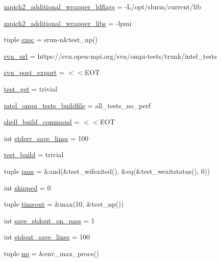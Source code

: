 \begin{DoxyCompactItemize}
\item 
\hyperlink{namespacempich2-template_ae2865f33a6b3ae966c6e7b785d0553b5}{mpich2\-\_\-additional\-\_\-wrapper\-\_\-ldflags} = -\/L/opt/slurm/current/lib
\item 
\hyperlink{namespacempich2-template_a93955bb1c58ee54b6ec759ce3ec7ab05}{mpich2\-\_\-additional\-\_\-wrapper\-\_\-libs} = -\/lpmi
\item 
tuple \hyperlink{namespacempich2-template_a3e54d8824fc59af417917b87182bdeb7}{exec} = srun-\/n\&test\-\_\-np()
\item 
\hyperlink{namespacempich2-template_a4951a49f371e925195481dc34a166a0a}{svn\-\_\-url} = https\-://svn.\-open-\/mpi.\-org/svn/ompi-\/tests/trunk/intel\-\_\-tests
\item 
\hyperlink{namespacempich2-template_a8bdb132d6863e51986a00ebae55adabd}{svn\-\_\-post\-\_\-export} = $<$$<$E\-O\-T
\item 
\hyperlink{namespacempich2-template_abf3c50e4ed6bd38b7845e7aa1d9b4a67}{test\-\_\-get} = trivial
\item 
\hyperlink{namespacempich2-template_addb99c522a88e9f52ea85bfbb54d50be}{intel\-\_\-ompi\-\_\-tests\-\_\-buildfile} = all\-\_\-tests\-\_\-no\-\_\-perf
\item 
\hyperlink{namespacempich2-template_a79f63031d3664a486ed5bab613e4468f}{shell\-\_\-build\-\_\-command} = $<$$<$E\-O\-T
\item 
int \hyperlink{namespacempich2-template_a4526a47057dcced7297a2eb36bc0f73c}{stderr\-\_\-save\-\_\-lines} = 100
\item 
\hyperlink{namespacempich2-template_a74bcc1b555e44b4c152e7a6cba7bdd41}{test\-\_\-build} = trivial
\item 
tuple \hyperlink{namespacempich2-template_ac6c94e8a4a76923d3a3720603dfaa59f}{pass} = \&and(\&test\-\_\-wifexited(), \&eq(\&test\-\_\-wexitstatus(), 0))
\item 
int \hyperlink{namespacempich2-template_a082338bf19ff413c63167b2cf16d7cc2}{skipped} = 0
\item 
tuple \hyperlink{namespacempich2-template_a59c507b362aba1d2422478a441eb13bc}{timeout} = \&max(10, \&test\-\_\-np())
\item 
int \hyperlink{namespacempich2-template_ab8e41d30a18bb21a628c48447ef357a8}{save\-\_\-stdout\-\_\-on\-\_\-pass} = 1
\item 
int \hyperlink{namespacempich2-template_af6c50bb5f1dbba22780519e1035267d5}{stdout\-\_\-save\-\_\-lines} = 100
\item 
tuple \hyperlink{namespacempich2-template_a1e4ef87053b35546931a526e5b33730f}{np} = \&env\-\_\-max\-\_\-procs()

\end{DoxyCompactItemize}
